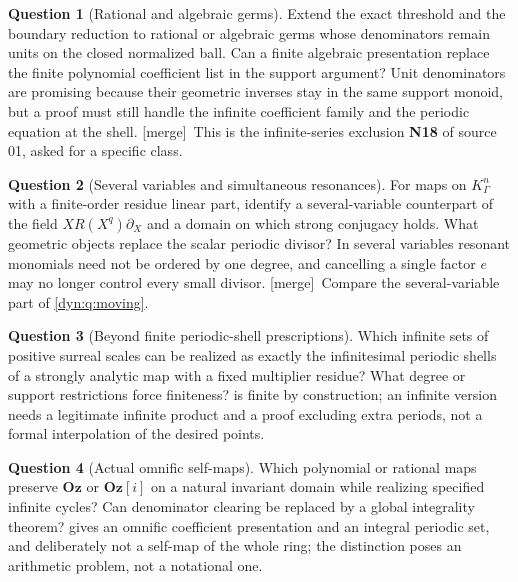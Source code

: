 \documentclass[11pt,letterpaper]{article}
\theoremstyle{definition}
\newtheorem{question}[question]{Question}
\theoremstyle{remark}
\newcommand{\Oz}{\mathbf{Oz}}
\newcommand{\mergetag}{\textup{\textsf{\small[merge]}}}%
\numberwithin{equation}{section}
\begin{document}
\begin{question}[Rational and algebraic germs]\label{dyn:rd:q:rational}
Extend the exact threshold and the boundary reduction to rational or
algebraic germs whose denominators remain units on the closed normalized
ball. Can a finite algebraic presentation replace the finite polynomial
coefficient list in the support argument? Unit denominators are promising
because their geometric inverses stay in the same support monoid, but a
proof must still handle the infinite coefficient family and the periodic
equation at the shell. \mergetag\ This is the infinite-series exclusion
\textbf{N18} of source 01, asked for a specific class.
\end{question}

\begin{question}[Several variables and simultaneous resonances]
\label{dyn:rd:q:several}
For maps on $K_\Gamma^{n}$ with a finite-order residue linear part, identify
a several-variable counterpart of the field $XR(X^{q})\partial_X$ and a
domain on which strong conjugacy holds. What geometric objects replace the
scalar periodic divisor? In several variables resonant monomials need not
be ordered by one degree, and cancelling a single factor $e$ may no longer
control every small divisor. \mergetag\ Compare the several-variable part
of \cref{dyn:q:moving}.
\end{question}

\begin{question}[Beyond finite periodic-shell prescriptions]
\label{dyn:rd:q:shells}
Which infinite sets of positive surreal scales can be realized as exactly
the infinitesimal periodic shells of a strongly analytic map with a fixed
multiplier residue? What degree or support restrictions force finiteness?
 is finite by construction; an infinite version
needs a legitimate infinite product and a proof excluding extra periods, not
a formal interpolation of the desired points.
\end{question}

\begin{question}[Actual omnific self-maps]\label{dyn:rd:q:omnific}
Which polynomial or rational maps preserve $\Oz$ or $\Oz[i]$ on a natural
invariant domain while realizing specified infinite cycles? Can denominator
clearing be replaced by a global integrality theorem?
 gives an omnific coefficient presentation and an
integral periodic set, and deliberately not a self-map of the whole ring;
the distinction poses an arithmetic problem, not a notational one.
\end{question}
\end{document}

